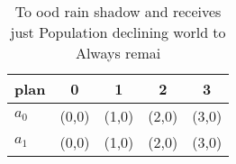 \documentclass[a4paper]{article}
\begin{document}
\begin{table}
\begin{adjustbox}{width=0.5\columnwidth}
\begin{tabular}{|l|l|l|l|l|}
\hline
\textbf{plan} & \multicolumn{1}{c|}{\textbf{0}} & \multicolumn{1}{c|}{\textbf{1}} & \multicolumn{1}{c|}{\textbf{2}} & \multicolumn{1}{c|}{\textbf{3}} \\ \hline
\textbf{$a_0$}  & (0,0) & (1,0) & (2,0) & (3,0) \\ \hline
\textbf{$a_1$}  & (0,0) & (1,0) & (2,0) & (3,0) \\ \hline
\end{tabular}
\end{adjustbox}
\caption{To ood rain shadow and receives just Population declining world to Always remai
}
\end{table}
\end{document}
